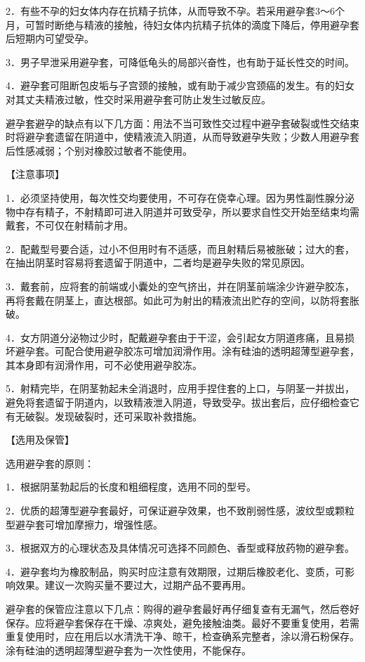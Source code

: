 \documentclass[12pt,UTF8]{ctexbook}
\begin{document}
2．有些不孕的妇女体内存在抗精子抗体，从而导致不孕。若采用避孕套3～6个月，可暂时断绝与精液的接触，待妇女体内抗精子抗体的滴度下降后，停用避孕套后短期内可望受孕。

3．男子早泄采用避孕套，可降低龟头的局部兴奋性，也有助于延长性交的时间。

4．避孕套可阻断包皮垢与子宫颈的接触，或有助于减少宫颈癌的发生。有的妇女对其丈夫精液过敏，性交时采用避孕套可防止发生过敏反应。

避孕套避孕的缺点有以下几方面：用法不当可致性交过程中避孕套破裂或性交结束时将避孕套遗留在阴道中，使精液流入阴道，从而导致避孕失败；少数人用避孕套后性感减弱；个别对橡胶过敏者不能使用。

【注意事项】

1．必须坚持使用，每次性交均要使用，不可存在侥幸心理。因为男性副性腺分泌物中存有精子，不射精即可进入阴道并可致受孕，所以要求自性交开始至结束均需戴套，不可仅在射精前才用。

2．配戴型号要合适，过小不但用时有不适感，而且射精后易被胀破；过大的套，在抽出阴茎时容易将套遗留于阴道中，二者均是避孕失败的常见原因。

3．戴套前，应将套的前端或小囊处的空气挤出，并在阴茎前端涂少许避孕胶冻，再将套戴在阴茎上，直达根部。如此可为射出的精液流出贮存的空间，以防将套胀破。

4．女方阴道分泌物过少时，配戴避孕套由于干涩，会引起女方阴道疼痛，且易损坏避孕套。可配合使用避孕胶冻可增加润滑作用。涂有硅油的透明超薄型避孕套，其本身即有润滑作用，可不必使用避孕胶冻。

5．射精完毕，在阴茎勃起未全消退时，应用手捏住套的上口，与阴茎一并拔出，避免将套遗留于阴道内，以致精液泄入阴道，导致受孕。拔出套后，应仔细检查它有无破裂。发现破裂时，还可采取补救措施。

【选用及保管】

选用避孕套的原则：

1．根据阴茎勃起后的长度和粗细程度，选用不同的型号。

2．优质的超薄型避孕套最好，可保证避孕效果，也不致削弱性感，波纹型或颗粒型避孕套可增加摩擦力，增强性感。

3．根据双方的心理状态及具体情况可选择不同颜色、香型或释放药物的避孕套。

4．避孕套均为橡胶制品，购买时应注意有效期限，过期后橡胶老化、变质，可影响效果。建议一次购买量不要过大，过期产品不要再用。

避孕套的保管应注意以下几点：购得的避孕套最好再仔细复查有无漏气，然后卷好保存。应将避孕套保存在干燥、凉爽处，避免接触油类。最好不要重复使用，若需重复使用时，应在用后以水清洗干净、晾干，检查确系完整者，涂以滑石粉保存。涂有硅油的透明超薄型避孕套为一次性使用，不能保存。
\end{document}
